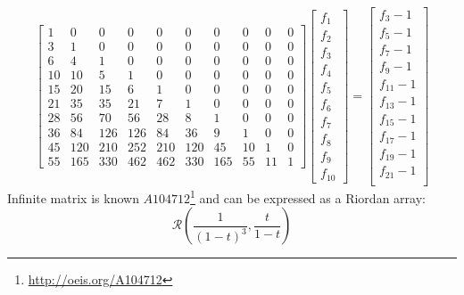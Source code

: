 \documentclass[a4paper,dottedtoc,headinclude,footinclude]{report} %
\theoremstyle{plain}
\begin{document}
    \begin{displaymath}
        \left[
        \begin{array}{cccccccccc}
            1 & 0 & 0 & 0 & 0 & 0 & 0 & 0 & 0 & 0\\
            3 & 1 & 0 & 0 & 0 & 0 & 0 & 0 & 0 & 0\\
            6 & 4 & 1 & 0 & 0 & 0 & 0 & 0 & 0 & 0\\
            10 & 10 & 5 & 1 & 0 & 0 & 0 & 0 & 0 & 0\\
            15 & 20 & 15 & 6 & 1 & 0 & 0 & 0 & 0 & 0\\
            21 & 35 & 35 & 21 & 7 & 1 & 0 & 0 & 0 & 0\\
            28 & 56 & 70 & 56 & 28 & 8 & 1 & 0 & 0 & 0\\
            36 & 84 & 126 & 126 & 84 & 36 & 9 & 1 & 0 & 0\\
            45 & 120 & 210 & 252 & 210 & 120 & 45 & 10 & 1 & 0\\
            55 & 165 & 330 & 462 & 462 & 330 & 165 & 55 & 11 & 1
            \end{array}\right]  \left[
            \begin{array}{c}
                f_{1}\\
                f_{2}\\
                f_{3}\\
                f_{4}\\
                f_{5}\\
                f_{6}\\
                f_{7}\\
                f_{8}\\
                f_{9}\\
                f_{10}\end{array}\right] = \left[
            \begin{array}{c}
                f_{3} - 1\\
                f_{5} - 1\\
                f_{7} - 1\\
                f_{9} - 1\\
                f_{11} - 1\\
                f_{13} - 1\\
                f_{15} - 1\\
                f_{17} - 1\\
                f_{19} - 1\\
                f_{21} - 1\\
                \end{array}\right]
    \end{displaymath}
    Infinite matrix is known $A104712$\footnote{\url{http://oeis.org/A104712}}
    and can be expressed as a Riordan array:
    \begin{displaymath}
        \mathcal{R}\left(\frac{1}{(1-t)^3}, \frac{t}{1-t}\right)
    \end{displaymath}
\end{document}
